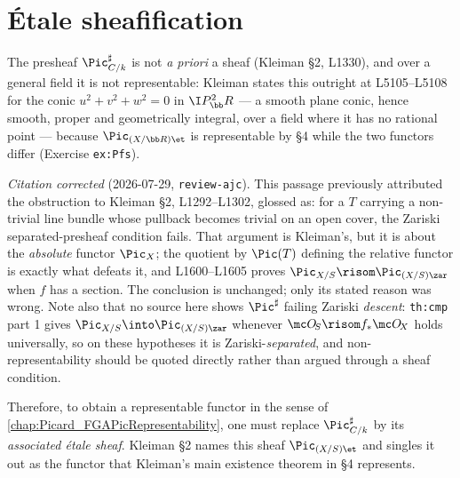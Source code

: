 \section{\'Etale sheafification}
\label{sec:relpic_etale_sheaf}

The presheaf \(\Pic^\sharp_{C/k}\) is not \emph{a priori} a sheaf (Kleiman
\S 2, L1330), and over a general field it is not representable: Kleiman states
this outright at L5105--L5108 for the conic \(u^2+v^2+w^2=0\) in
\(\I P^2_\bb R\) --- a smooth plane conic, hence smooth, proper and
geometrically integral, over a field where it has no rational point ---
because \(\Pic_{(X/\bb R)\et}\) is representable by \S 4 while the two
functors differ (Exercise \texttt{ex:Pfs}).

\emph{Citation corrected} (2026-07-29, \texttt{review-ajc}). This passage
previously attributed the obstruction to Kleiman \S 2, L1292--L1302, glossed as:
for a \(T\) carrying a non-trivial line bundle whose pullback becomes trivial on
an open cover, the Zariski separated-presheaf condition fails. That argument is
Kleiman's, but it is about the \emph{absolute} functor \(\Pic_X\); the quotient by
\(\Pic(T)\) defining the relative functor is exactly what defeats it, and
L1600--L1605 proves \(\Pic_{X/S} \risom \Pic_{(X/S)\zar}\) when \(f\) has a
section. The conclusion is unchanged; only its stated reason was wrong. Note
also that no source here shows \(\Pic^\sharp\) failing Zariski \emph{descent}:
\texttt{th:cmp} part 1 gives \(\Pic_{X/S}\into\Pic_{(X/S)\zar}\) whenever
\(\mc O_{\!S}\risom f_*\mc O_{\!X}\) holds universally, so on these hypotheses it
is Zariski-\emph{separated}, and non-representability should be quoted directly
rather than argued through a sheaf condition.

Therefore, to obtain a representable functor in the sense of
\cref{chap:Picard_FGAPicRepresentability}, one must replace
\(\Pic^\sharp_{C/k}\) by its \emph{associated \'etale sheaf}. Kleiman \S 2 names
this sheaf \(\Pic_{(X/S)\et}\) and singles it out as the functor that Kleiman's
main existence theorem in \S 4 represents.

